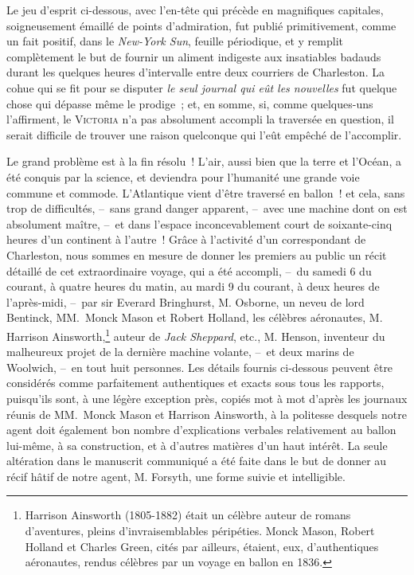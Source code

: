 \documentclass[french,twoside]{book} %
\begin{document}
\noindent Le jeu d’esprit ci-dessous, avec l’en-tête qui précède en magnifiques capitales, soigneusement émaillé de points d’admiration, fut publié primitivement, comme un fait positif, dans le \emph{New-York Sun}, feuille périodique, et y remplit complètement le but de fournir un aliment indigeste aux insatiables badauds durant les quelques heures d’intervalle entre deux courriers de Charleston. La cohue qui se fit pour se disputer \emph{le seul journal qui eût les nouvelles} fut quelque chose qui dépasse même le prodige ; et, en somme, si, comme quelques-uns l’affirment, le {\scshape Victoria} n’a pas absolument accompli la traversée en question, il serait difficile de trouver une raison quelconque qui l’eût empêché de l’accomplir.\par
Le grand problème est à la fin résolu ! L’air, aussi bien que la terre et l’Océan, a été conquis par la science, et deviendra pour l’humanité une grande voie commune et commode. L’Atlantique vient d’être traversé en ballon ! et cela, sans trop de difficultés, – sans grand danger apparent, – avec une machine dont on est absolument maître, – et dans l’espace inconcevablement court de soixante-cinq heures d’un continent à l’autre ! Grâce à l’activité d’un correspondant de Charleston, nous sommes en mesure de donner les premiers au public un récit détaillé de cet extraordinaire voyage, qui a été accompli, – du samedi 6 du courant, à quatre heures du matin, au mardi 9 du courant, à deux heures de l’après-midi, – par sir Everard Bringhurst, M. Osborne, un neveu de lord Bentinck, MM. Monck Mason et Robert Holland, les célèbres aéronautes, M. Harrison Ainsworth,\footnote{Harrison Ainsworth (1805-1882) était un célèbre auteur de romans d’aventures, pleins d’invraisemblables péripéties. Monck Mason, Robert Holland et Charles Green, cités par ailleurs, étaient, eux, d’authentiques aéronautes, rendus célèbres par un voyage en ballon en 1836.} auteur de \emph{Jack Sheppard}, etc., M. Henson, inventeur du malheureux projet de la dernière machine volante, – et deux marins de Woolwich, – en tout huit personnes. Les détails fournis ci-dessous peuvent être considérés comme parfaitement authentiques et exacts sous tous les rapports, puisqu’ils sont, à une légère exception près, copiés mot à mot d’après les journaux réunis de MM. Monck Mason et Harrison Ainsworth, à la politesse desquels notre agent doit également bon nombre d’explications verbales relativement au ballon lui-même, à sa construction, et à d’autres matières d’un haut intérêt. La seule altération dans le manuscrit communiqué a été faite dans le but de donner au récif hâtif de notre agent, M. Forsyth, une forme suivie et intelligible.\par
\end{document}
